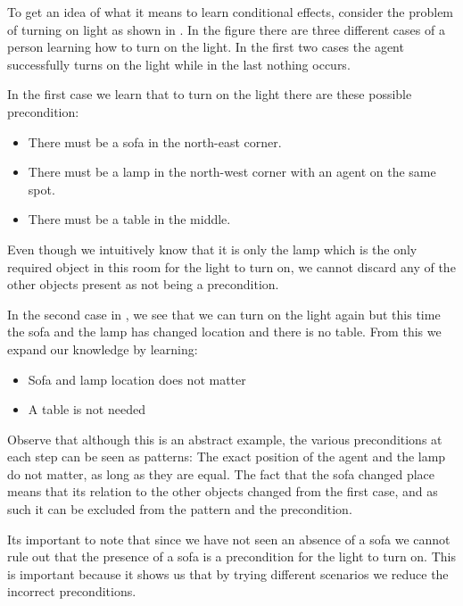 \documentclass[\master/Master.tex]{subfiles}
\begin{document}
\begin{example}\label{ex:ca:light-on} To get an idea of what it means to learn conditional effects,
consider the problem of turning on light as shown in .
In the figure there are three different cases of a person learning how to turn on the
light. In the first two cases the agent successfully turns on the light while in the last nothing occurs.

In the first case we learn that to turn on the light there are these possible precondition:
\begin{itemize}
	\item There must be a sofa in the north-east corner.
	\item There must be a lamp in the north-west corner with an agent on the same spot.
	\item There must be a table in the middle.
\end{itemize}
Even though we intuitively know that it is only the lamp which is the only required object in this room for the light to turn on, we cannot discard any of the other objects present as not being a precondition.


	In the second case in ,
	we see that we can turn on the light again but this time the sofa and the lamp has changed location and
	there is no table. From this we expand our knowledge by learning:
	\begin{itemize}
		\item Sofa and lamp location does not matter
		\item A table is not needed
	\end{itemize}
    
    Observe that although this is an abstract example, the various preconditions at each step can be seen as patterns: The exact position of the agent and the lamp do not matter, as long as they are equal. The fact that the sofa changed place means that its relation to the other objects changed from the first case, and as such it can be excluded from the pattern and the precondition.

	Its important to note that since we have not seen an absence of a sofa we cannot rule out that the presence of a sofa is a precondition for the light to turn on. This is important because it shows us that by trying different scenarios we reduce the incorrect preconditions. 

\end{example}
%
\end{document}
